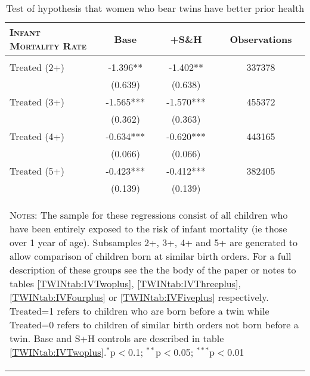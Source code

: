 \begin{table}[htpb!]
\caption{Test of hypothesis that women who bear twins have better prior health}\label{TWINtab:IMR}\vspace{-5mm}\begin{center}\begin{tabular}{lccc}
\toprule \toprule 
\textsc{Infant Mortality Rate}& Base & +S\&H & Observations \\ \midrule 
\begin{footnotesize}\end{footnotesize}& 
\begin{footnotesize}\end{footnotesize}& 
\begin{footnotesize}\end{footnotesize}& 
\begin{footnotesize}\end{footnotesize}\\ 
Treated (2+)\hspace{5mm}\hspace{5mm}\hspace{5mm}\hspace{5mm}\hspace{5mm}\hspace{5mm}&-1.396**&-1.402**&337378\\
&(0.639)&(0.638)&\\
Treated (3+)\hspace{5mm}&-1.565***&-1.570***&455372\\
&(0.362)&(0.363)&\\
Treated (4+)&-0.634***&-0.620***&443165\\
&(0.066)&(0.066)&\\
Treated (5+)&-0.423***&-0.412***&382405\\
&(0.139)&(0.139)&\\
\midrule\multicolumn{4}{p{10.6cm}}{\begin{footnotesize}\textsc{Notes:} The sample for these regressions consist of all children who have been entirely exposed to the risk of infant mortality (ie those over 1 year of age). Subsamples 2+, 3+, 4+ and 5+ are generated to allow comparison of children born at similar birth orders.  For a full description of these groups see the the body of the paper or notes to tables \ref{TWINtab:IVTwoplus}, \ref{TWINtab:IVThreeplus}, \ref{TWINtab:IVFourplus} or \ref{TWINtab:IVFiveplus} respectively. Treated=1 refers to children who are born before a twin while Treated=0 refers to children of similar birth orders not born before a twin.  Base and S+H controls are described in table \ref{TWINtab:IVTwoplus}.$^{*}$p$<$0.1; $^{**}$p$<$0.05; $^{***}$p$<$0.01 
\end{footnotesize}} \\ \bottomrule 
\end{tabular}\end{center}\end{table}